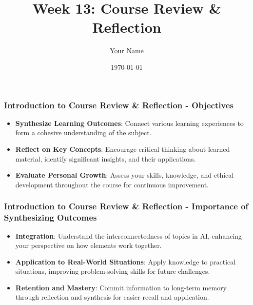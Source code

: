 \documentclass[aspectratio=169]{beamer}
\title[Course Review & Reflection]{Week 13: Course Review \& Reflection}
\author[Your Name]{Your Name}
\institute[University Name]{
  Your Department\\
  University Name\\
  Email: your.email@university.edu\\
  Website: www.university.edu
}
\date{\today}
\begin{document}
\frame{\titlepage}

\begin{frame}[fragile]
    \frametitle{Introduction to Course Review \& Reflection - Objectives}
    \begin{itemize}
        \item \textbf{Synthesize Learning Outcomes}: Connect various learning experiences to form a cohesive understanding of the subject.
        \item \textbf{Reflect on Key Concepts}: Encourage critical thinking about learned material, identify significant insights, and their applications.
        \item \textbf{Evaluate Personal Growth}: Assess your skills, knowledge, and ethical development throughout the course for continuous improvement.
    \end{itemize}
\end{frame}

\begin{frame}[fragile]
    \frametitle{Introduction to Course Review \& Reflection - Importance of Synthesizing Outcomes}
    \begin{itemize}
        \item \textbf{Integration}: Understand the interconnectedness of topics in AI, enhancing your perspective on how elements work together.
        \item \textbf{Application to Real-World Situations}: Apply knowledge to practical situations, improving problem-solving skills for future challenges.
        \item \textbf{Retention and Mastery}: Commit information to long-term memory through reflection and synthesis for easier recall and application.
    \end{itemize}
\end{frame}
\end{document}
